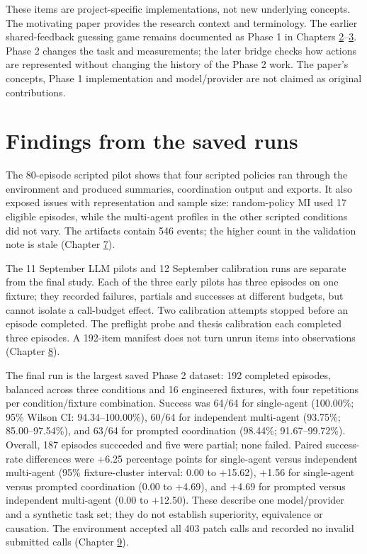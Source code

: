 \documentclass[12pt,a4paper,oneside]{report}
\begin{document}
These items are project-specific implementations, not new underlying concepts. The motivating paper provides the research context and terminology. The earlier shared-feedback guessing game remains documented as Phase 1 in Chapters \hyperref[chapter-02]{2}–\hyperref[chapter-03]{3}. Phase 2 changes the task and measurements; the later bridge checks how actions are represented without changing the history of the Phase 2 work. The paper’s concepts, Phase 1 implementation and model/provider are not claimed as original contributions.

\section{Findings from the saved runs}
The 80-episode scripted pilot shows that four scripted policies ran through the environment and produced summaries, coordination output and exports. It also exposed issues with representation and sample size: random-policy MI used 17 eligible episodes, while the multi-agent profiles in the other scripted conditions did not vary. The artifacts contain 546 events; the higher count in the validation note is stale (Chapter \hyperref[chapter-07]{7}).

The 11 September LLM pilots and 12 September calibration runs are separate from the final study. Each of the three early pilots has three episodes on one fixture; they recorded failures, partials and successes at different budgets, but cannot isolate a call-budget effect. Two calibration attempts stopped before an episode completed. The preflight probe and thesis calibration each completed three episodes. A 192-item manifest does not turn unrun items into observations (Chapter \hyperref[chapter-08]{8}).

The final run is the largest saved Phase 2 dataset: 192 completed episodes, balanced across three conditions and 16 engineered fixtures, with four repetitions per condition/fixture combination. Success was 64/64 for single-agent (100.00\%; 95\% Wilson CI: 94.34–100.00\%), 60/64 for independent multi-agent (93.75\%; 85.00–97.54\%), and 63/64 for prompted coordination (98.44\%; 91.67–99.72\%). Overall, 187 episodes succeeded and five were partial; none failed. Paired success-rate differences were +6.25 percentage points for single-agent versus independent multi-agent (95\% fixture-cluster interval: 0.00 to +15.62), +1.56 for single-agent versus prompted coordination (0.00 to +4.69), and +4.69 for prompted versus independent multi-agent (0.00 to +12.50). These describe one model/provider and a synthetic task set; they do not establish superiority, equivalence or causation. The environment accepted all 403 patch calls and recorded no invalid submitted calls (Chapter \hyperref[chapter-09]{9}).
\end{document}

